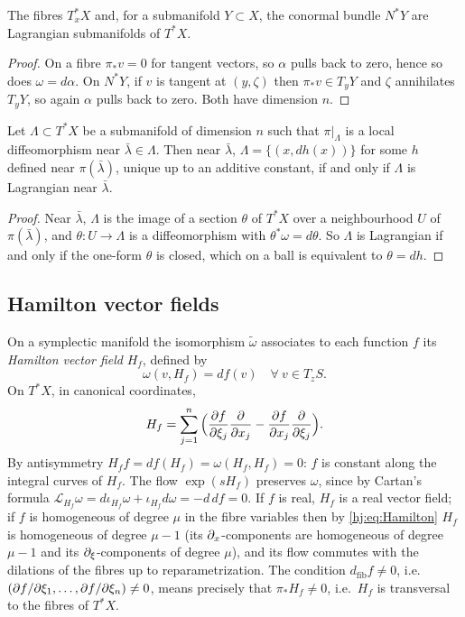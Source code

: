 \begin{lemma}\label{hj:lem:examples}
  The fibres $T^*_xX$ and, for a submanifold $Y\subset X$, the conormal bundle
  $N^*Y$ are Lagrangian submanifolds of $T^*X$.
\end{lemma}
\begin{proof}
  On a fibre $\pi_*v=0$ for tangent vectors, so $\alpha$ pulls back to zero, hence
  so does $\omega=d\alpha$.  On $N^*Y$, if $v$ is tangent at $(y,\zeta)$ then
  $\pi_*v\in T_yY$ and $\zeta$ annihilates $T_yY$, so again $\alpha$ pulls back to
  zero.  Both have dimension $n$.
\end{proof}

\begin{lemma}\label{hj:lem:graph}
  Let $\Lambda\subset T^*X$ be a submanifold of dimension $n$ such that
  $\pi|_\Lambda$ is a local diffeomorphism near $\bar\lambda\in\Lambda$.  Then
  near $\bar\lambda$, $\Lambda=\{(x,dh(x))\}$ for some $h$ defined near
  $\pi(\bar\lambda)$, unique up to an additive constant, if and only if $\Lambda$
  is Lagrangian near $\bar\lambda$.
\end{lemma}
\begin{proof}
  Near $\bar\lambda$, $\Lambda$ is the image of a section $\theta$ of $T^*X$ over a
  neighbourhood $U$ of $\pi(\bar\lambda)$, and $\theta:U\to\Lambda$ is a
  diffeomorphism with $\theta^*\omega=d\theta$.  So $\Lambda$ is Lagrangian if and
  only if the one-form $\theta$ is closed, which on a ball is equivalent to
  $\theta=dh$.
\end{proof}

\subsection{Hamilton vector fields}
On a symplectic manifold the isomorphism $\tilde\omega$ associates to each
function $f$ its \emph{Hamilton vector field} $H_f$, defined by
\begin{equation*}
  \omega(v,H_f)=df(v)\quad\forall\ v\in T_zS.
\end{equation*}
On $T^*X$, in canonical coordinates,
\begin{equation}\label{hj:eq:Hamilton}
  H_f=\sum_{j=1}^n\Big(\frac{\partial f}{\partial\xi_j}\frac{\partial}{\partial x_j}
  -\frac{\partial f}{\partial x_j}\frac{\partial}{\partial\xi_j}\Big).
\end{equation}
By antisymmetry $H_ff=df(H_f)=\omega(H_f,H_f)=0$: $f$ is constant along the
integral curves of $H_f$.  The flow $\exp(sH_f)$ preserves $\omega$, since by
Cartan's formula $\mathcal L_{H_f}\omega=d\iota_{H_f}\omega+\iota_{H_f}d\omega
=-d\,df=0$.  If $f$ is real, $H_f$ is a real vector field; if $f$ is homogeneous of
degree $\mu$ in the fibre variables then by \eqref{hj:eq:Hamilton} $H_f$ is
homogeneous of degree $\mu-1$ (its $\partial_x$-components are homogeneous of degree
$\mu-1$ and its $\partial_\xi$-components of degree $\mu$), and its flow commutes with
the dilations of the fibres up to reparametrization.  The condition
$d_{\mathrm{fib}}f\ne0$, i.e.\ $(\partial f/\partial\xi_1,\dots,\partial f/\partial\xi_n)\ne0$,
means precisely that $\pi_*H_f\ne0$, i.e.\ $H_f$ is transversal to the fibres
of $T^*X$.

